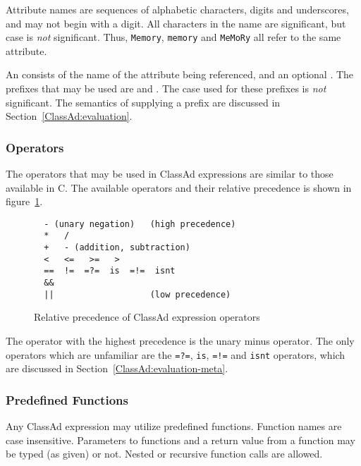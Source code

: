 Attribute names are sequences of alphabetic characters, digits and underscores,
and may not begin with a digit.  All characters in the name are significant,
but case is \emph{not} significant.  Thus, \verb+Memory+, \verb+memory+ and 
\verb+MeMoRy+ all refer to the same attribute.

An  consists of the name of the attribute being 
referenced, and an optional .  The 
prefixes that may be used are  and .
The case used for these prefixes is \emph{not} significant.
The semantics of supplying a prefix are discussed in 
Section~\ref{ClassAd:evaluation}.

\subsubsection{Operators}
The operators that may be used in ClassAd expressions are similar to those
available in C.  The available operators and their relative precedence is shown 
in figure~\ref{ClassAd:operator-fig}.
\begin{figure}[hbt]
\begin{verbatim}
  - (unary negation)   (high precedence)
  *   / 
  +   - (addition, subtraction)
  <   <=   >=   >
  ==  !=  =?=  is  =!=  isnt
  &&
  ||                   (low precedence) 
\end{verbatim}
\caption{\label{ClassAd:operator-fig}Relative precedence of ClassAd expression
operators}
\end{figure}
The operator with the highest precedence is the unary minus operator.  The
only operators which are unfamiliar are the \verb+=?=+, \verb+is+, \verb+=!=+ and \verb+isnt+
operators, which are discussed in Section~\ref{ClassAd:evaluation-meta}.


\subsubsection{\label{sec:classadFunctions}Predefined Functions}

Any ClassAd expression may utilize predefined functions.
Function names are case insensitive.
Parameters to functions 
and a return value from a function 
may be typed (as given) or not.
Nested or recursive function calls are allowed.

